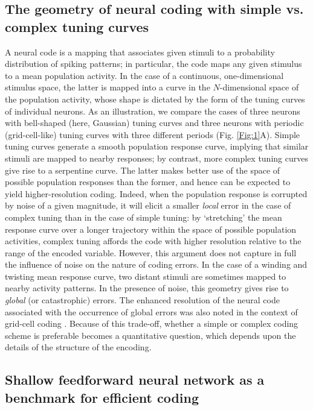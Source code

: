 \documentclass[a4paper]{article}%
\begin{document}
\subsection*{The geometry of neural coding with simple vs. complex tuning
curves}

A neural code is a mapping that associates given stimuli to a probability
distribution of spiking patterns; in particular, the code maps any given
stimulus to a mean population activity. In the case of a continuous,
one-dimensional stimulus space, the latter is mapped into a curve in the
$N$-dimensional space of the population activity, whose shape is dictated by
the form of the tuning curves of individual neurons. As an illustration, we
compare the cases of three neurons with bell-shaped (here, Gaussian) tuning
curves and three neurons with periodic (grid-cell-like) tuning curves with
three different periods (Fig. \ref{Fig:1}A). Simple tuning curves generate a
smooth population response curve, implying that similar stimuli are mapped to
nearby responses; by contrast, more complex tuning curves give rise to a
serpentine curve. The latter makes better use of the space of possible
population responses than the former, and hence can be expected to yield
higher-resolution coding. Indeed, when the population response is corrupted by
noise of a given magnitude, it will elicit a smaller \textit{local} error in
the case of complex tuning than in the case of simple tuning: by `stretching'
the mean response curve over a longer trajectory within the space of possible
population activities, complex tuning affords the code with higher resolution
relative to the range of the encoded variable. However, this argument does not
capture in full the influence of noise on the nature of coding errors. In the
case of a winding and twisting mean response curve, two distant stimuli are
sometimes mapped to nearby activity patterns. In the presence of noise, this
geometry gives rise to \textit{global} (or catastrophic) errors. The enhanced
resolution of the neural code associated with the occurrence of global errors
was also noted in the context of grid-cell coding
\cite[]{Welinder2008GridLearning,Sreenivasan2011GridComputation}. Because of
this trade-off, whether a simple or complex coding scheme is preferable
becomes a quantitative question, which depends upon the details of the
structure of the encoding.

\subsection*{Shallow feedforward neural network as a benchmark for efficient
coding}
\end{document}
